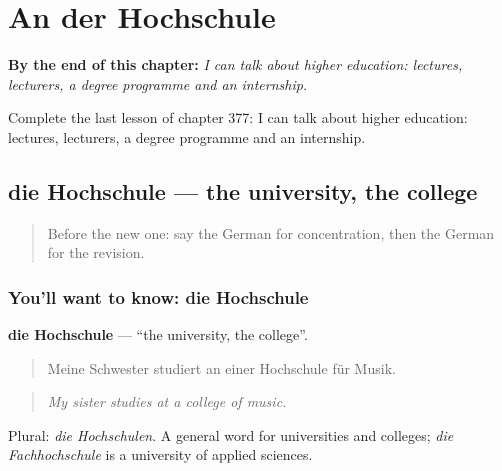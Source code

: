
\chapter{An der Hochschule}
\label{ch:ge-an-der-hochschule}

\begin{chapteropening}
\textbf{By the end of this chapter:} \emph{I can talk about higher education: lectures, lecturers, a degree programme and an internship.}

Complete the last lesson of chapter 377: I can talk about higher education: lectures, lecturers, a degree programme and an internship.
\end{chapteropening}

\section[die Hochschule]{die Hochschule — the university, the college}

\label{lesson:GE-C377-hochschule}



\begin{quote}
Before the new one: say the German for concentration, then the German for the revision.
\end{quote}

\subsection*{You'll want to know: die Hochschule}
\textbf{die Hochschule} — \textquotedblleft{}the university, the college\textquotedblright{}.

\begin{quote}
Meine Schwester studiert an einer Hochschule für Musik.
\end{quote}

\begin{quote}
\emph{My sister studies at a college of music.}
\end{quote}

Plural: \emph{die Hochschulen}. A general word for universities and colleges; \emph{die Fachhochschule} is a university of applied sciences.

